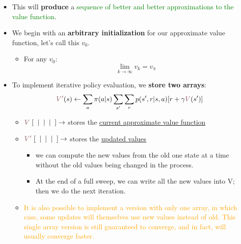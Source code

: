 \documentclass[12pt, a4paper]{article}
\begin{document}
\begin{itemize}
    \item This will \textbf{produce} a \textcolor{Green}{sequence of better and better approximations to the value function}.

    \item We begin with an \textbf{arbitrary initialization} for our approximate value function, let's call this $v_0$.
    \begin{itemize}
      \item For any $v_0$:
        $$
        \lim_{k \to \infty} v_k = v_\pi
        $$
    \end{itemize}
    \item To implement iterative policy evaluation, we \textbf{store two arrays}:
    $$
    \textcolor[HTML]{8F5760}{V'}(s) \leftarrow \sum_a \pi(a|s) \sum_{s'} \sum_{r} p(s',r|s,a) [r + \gamma \textcolor[HTML]{8F5760}{V} (s')]
    $$
    \begin{itemize}
      \item $\textcolor[HTML]{8F5760}{V} \; [ \;\; | \;\; | \;\; | \;\; ] \rightarrow$ stores the \uline{current approximate value function}
      \item $\textcolor[HTML]{8F5760}{V'} \; [ \;\; | \;\; | \;\; | \;\; ] \rightarrow$ stores the \uline{updated values}
      \begin{itemize}
        \item we can compute the new values from the old one state at a time without the old values being changed in the process.
        \item At the end of a full sweep, we can write all the new values into V; then we do the next iteration.
      \end{itemize}
      \item \textcolor{Orange}{It is also possible to implement a version with only one array, in which case, some updates will themselves use new values instead of old. This single array version is still guaranteed to converge, and in fact, will usually converge faster.}
    \end{itemize}
\end{itemize}
\end{document}
